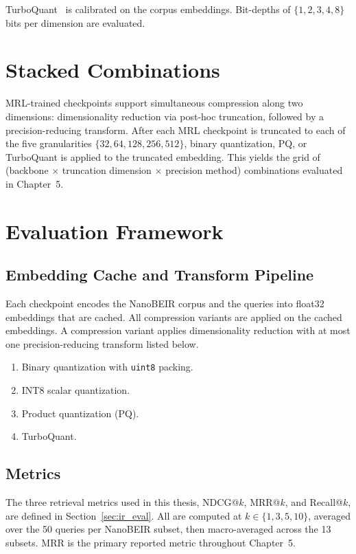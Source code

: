 TurboQuant~\cite{zandieh2025turboquant} is calibrated on the corpus
embeddings. Bit-depths of $\{1, 2, 3, 4, 8\}$ bits per dimension are evaluated.


\section{Stacked Combinations}
\label{sec:stacked_method}

MRL-trained checkpoints support simultaneous compression along two
dimensions: dimensionality reduction via post-hoc truncation, followed by a
precision-reducing transform. After each MRL checkpoint is truncated to
each of the five granularities $\{32, 64, 128, 256, 512\}$, binary
quantization, PQ, or TurboQuant is applied to the truncated embedding. This
yields the grid of (backbone $\times$ truncation dimension $\times$
precision method) combinations evaluated in Chapter~5.


\section{Evaluation Framework}
\label{sec:eval_framework}

\subsection{Embedding Cache and Transform Pipeline}

Each checkpoint encodes the NanoBEIR corpus and the queries into float32
embeddings that are cached. All compression variants are applied on the
cached embeddings. A compression variant applies dimensionality reduction
with at most one precision-reducing transform listed below.
%
\begin{enumerate}
  \item Binary quantization with \texttt{uint8} packing.
  \item INT8 scalar quantization.
  \item Product quantization (PQ).
  \item TurboQuant.
\end{enumerate}

\subsection{Metrics}
\label{sec:metrics}

The three retrieval metrics used in this thesis, NDCG@$k$, MRR@$k$, and
Recall@$k$, are defined in Section~\ref{sec:ir_eval}. All are computed at
$k \in \{1, 3, 5, 10\}$, averaged over the 50 queries per NanoBEIR subset,
then macro-averaged across the 13 subsets. MRR is the primary reported
metric throughout Chapter~5.

